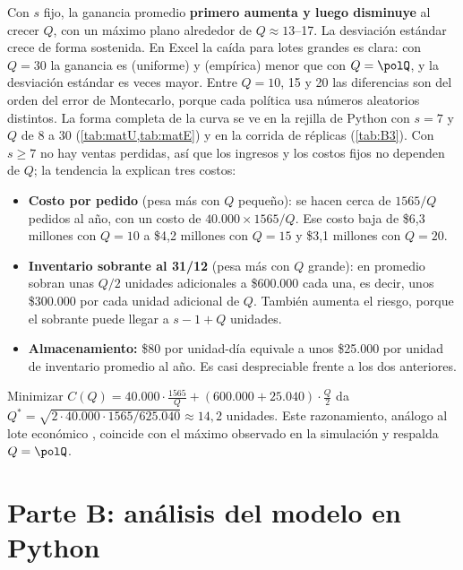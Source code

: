 Con $s$ fijo, la ganancia promedio \textbf{primero aumenta y luego disminuye} al crecer $Q$, con
un máximo plano alrededor de $Q\approx13$--17. La desviación estándar crece de forma sostenida.
En Excel la caída para lotes grandes es clara: con $Q=30$ la ganancia es \xlQtreintaU{}
(uniforme) y \xlQtreintaE{} (empírica) menor que con $Q=\polQ$, y la desviación estándar es
\xlQtreintaStdU{} veces mayor. Entre $Q=10$, 15 y 20 las diferencias son del orden del error de
Montecarlo, porque cada política usa números aleatorios distintos. La forma completa de la curva se ve en la rejilla de
Python con $s=7$ y $Q$ de 8 a 30 (\cref{tab:matU,tab:matE}) y en la corrida de \repsPrecision{}
réplicas (\cref{tab:B3}). Con $s\ge7$ no hay ventas perdidas, así que los ingresos y los costos
fijos no dependen de $Q$; la tendencia la explican tres costos:

\begin{itemize}
  \item \textbf{Costo por pedido} (pesa más con $Q$ pequeño): se hacen cerca de $1565/Q$ pedidos
  al año, con un costo de $40.000\times1565/Q$. Ese costo baja de \$6,3 millones con $Q=10$ a
  \$4,2 millones con $Q=15$ y \$3,1 millones con $Q=20$.
  \item \textbf{Inventario sobrante al 31/12} (pesa más con $Q$ grande): en promedio sobran unas
  $Q/2$ unidades adicionales a \$600.000 cada una, es decir, unos \$300.000 por cada unidad
  adicional de $Q$. También aumenta el riesgo, porque el sobrante puede llegar a $s-1+Q$ unidades.
  \item \textbf{Almacenamiento:} \$80 por unidad-día equivale a unos \$25.000 por unidad de
  inventario promedio al año. Es casi despreciable frente a los dos anteriores.
\end{itemize}

Minimizar $C(Q)=40.000\cdot\frac{1565}{Q}+(600.000+25.040)\cdot\frac{Q}{2}$ da
$Q^\ast=\sqrt{2\cdot40.000\cdot1565/625.040}\approx14{,}2$ unidades. Este razonamiento, análogo
al lote económico \cite{winston2004}, coincide con el máximo observado en la simulación y respalda $Q=\polQ$.

\section{Parte B: análisis del modelo en Python}

